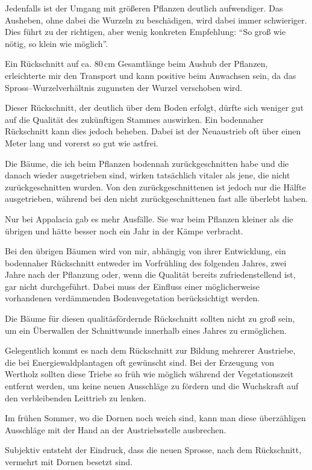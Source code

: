 \documentclass[twocolumn]{scrartcl}
\begin{document}
Jedenfalls ist der Umgang mit größeren Pflanzen deutlich aufwendiger.
Das Ausheben, ohne dabei die Wurzeln zu beschädigen, wird dabei immer
schwieriger. Dies führt zu der richtigen, aber wenig konkreten
Empfehlung: \enquote{So groß wie nötig, so klein wie möglich}.

Ein Rückschnitt auf ca. 80\,cm Gesamtlänge beim Aushub der Pflanzen,
erleichterte mir den Transport und kann positive beim Anwachsen sein,
da das Spross--Wurzelverhältnis zugunsten der Wurzel verschoben wird.

Dieser Rückschnitt, der deutlich über dem Boden erfolgt, dürfte sich
weniger gut auf die Qualität des zukünftigen Stammes auswirken. Ein
bodennaher Rückschnitt kann dies jedoch beheben. Dabei ist der
Neuaustrieb oft über einen Meter lang und vorerst so gut wie astfrei.

Die Bäume, die ich beim Pflanzen bodennah zurückgeschnitten habe und
die danach wieder ausgetrieben sind, wirken tatsächlich vitaler als
jene, die nicht zurückgeschnitten wurden. Von den zurückgeschnittenen
ist jedoch nur die Hälfte ausgetrieben, während bei den nicht
zurückgeschnittenen fast alle überlebt haben.

Nur bei Appalacia gab es mehr Ausfälle. Sie war beim Pflanzen kleiner
als die übrigen und hätte besser noch ein Jahr in der Kämpe verbracht.

Bei den übrigen Bäumen wird von mir, abhängig von ihrer Entwicklung,
ein bodennaher Rückschnitt entweder im Vorfrühling des folgenden
Jahres, zwei Jahre nach der Pflanzung oder, wenn die Qualität bereits
zufriedenstellend ist, gar nicht durchgeführt. Dabei muss der Einfluss
einer möglicherweise vorhandenen verdämmenden Bodenvegetation
berücksichtigt werden.

Die Bäume für diesen qualitäsfördernde Rückschnitt sollten nicht zu
groß sein, um ein Überwallen der Schnittwunde innerhalb eines Jahres
zu ermöglichen.

Gelegentlich kommt es nach dem Rückschnitt zur Bildung mehrerer
Austriebe, die bei Energiewaldplantagen oft gewünscht sind.  Bei der
Erzeugung von Wertholz sollten diese Triebe so früh wie möglich
während der Vegetationszeit entfernt werden, um keine neuen Ausschläge
zu fördern und die Wuchskraft auf den verbleibenden Leittrieb zu
lenken.

Im frühen Sommer, wo die Dornen noch weich sind, kann man diese
überzähligen Ausschläge mit der Hand an der Austriebsstelle
ausbrechen.

Subjektiv entsteht der Eindruck, dass die neuen Sprosse, nach dem
Rückschnitt, vermehrt mit Dornen besetzt sind.
\end{document}
